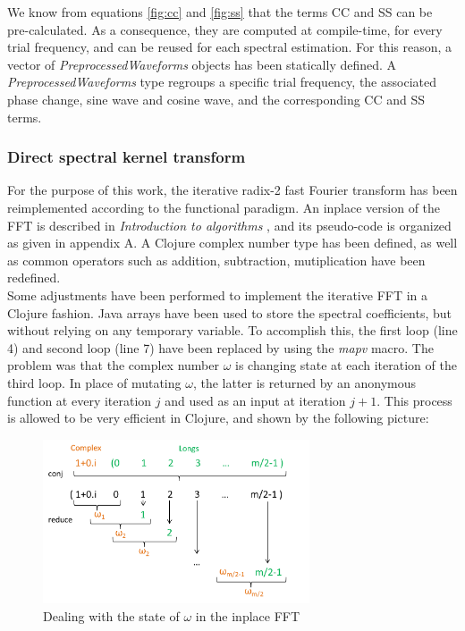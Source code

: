 \documentclass[letterpaper]{article}
\begin{document}
We know from equations \ref{fig:cc} and \ref{fig:ss} that the terms CC and SS can be pre-calculated. As a consequence, they are computed at compile-time,
for every trial frequency, and can be reused for each spectral estimation. For this reason, a vector of \textit{PreprocessedWaveforms} objects has been statically defined. A \textit{PreprocessedWaveforms}
type regroups a specific trial frequency, the associated phase change, sine wave and cosine wave, and the corresponding CC and SS terms.\\

\subsubsection{Direct spectral kernel transform}

For the purpose of this work, the iterative radix-2 fast Fourier transform has been reimplemented according to the functional paradigm. An inplace version of the FFT is described in \textit{Introduction to algorithms} \citep{FFT}, and its pseudo-code is organized as given in appendix A. A Clojure complex number type has been defined, as well as common operators such as addition, subtraction, mutiplication have been redefined. \\

Some adjustments have been performed to implement the iterative FFT in a Clojure fashion. Java arrays have been used to store the spectral coefficients, but without relying on any temporary variable. To accomplish this, the first loop (line 4) and second loop (line 7) have been replaced by using the \textit{mapv} macro. The problem was that the complex number $\omega$ is changing state at each iteration of the third loop. In place of mutating $\omega$, the latter is returned by an anonymous function at every iteration $j$ and used as an input at iteration $j + 1$. This process is allowed to be very efficient in Clojure, and shown by the following picture:

\FloatBarrier

\begin{figure}[h!]
\begin{center}
\includegraphics[width=3.1in,angle=0]{imgs/reduceconj.png}
\caption{Dealing with the state of $\omega$ in the inplace FFT}
\label{fig3}
\end{center}
\end{figure}
\end{document}
